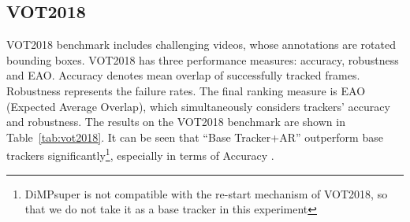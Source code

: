 \documentclass[final]{cvpr}
\begin{document}
{\begin{appendices}
\subsection{VOT2018}

VOT2018 benchmark includes  challenging videos, whose annotations are rotated bounding boxes. VOT2018 has three performance measures: accuracy, robustness and EAO. 
Accuracy denotes mean overlap of successfully tracked frames. Robustness represents the failure rates. The final ranking measure is EAO (Expected Average Overlap), which simultaneously considers 
trackers' accuracy and robustness. The results on the VOT2018 benchmark are shown in Table~\ref{tab:vot2018}. It can be seen that ``Base Tracker+AR'' outperform base trackers significantly\footnote{DiMPsuper is not compatible with the re-start mechanism of VOT2018, so that we do not take it as a base tracker in this experiment}, especially in terms of Accuracy . 

\begin{table}[!ht]
    \centering
    \caption{Comparison on the VOT2018 benchmark. 
    The best three results are marked in \textbf{\textcolor[rgb]{1,0,0}{red}}, \textbf{\textcolor[rgb]{0,1,0}{green}} and \textbf{\textcolor[rgb]{0,0,1}{blue}} bold fonts respectively.}
    \label{tab:vot2018}
    \vspace{-3mm}
\end{table}



\end{appendices}}
\end{document}
